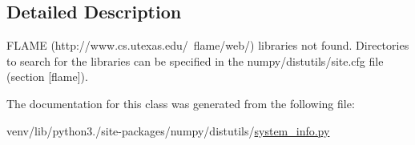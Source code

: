 \subsection{Detailed Description}
\begin{DoxyVerb}FLAME (http://www.cs.utexas.edu/~flame/web/) libraries not found.
Directories to search for the libraries can be specified in the
numpy/distutils/site.cfg file (section [flame]).\end{DoxyVerb}
 

The documentation for this class was generated from the following file\+:\begin{DoxyCompactItemize}
\item 
venv/lib/python3./site-\/packages/numpy/distutils/\hyperlink{system__info_8py}{system\+\_\+info.\+py}\end{DoxyCompactItemize}
